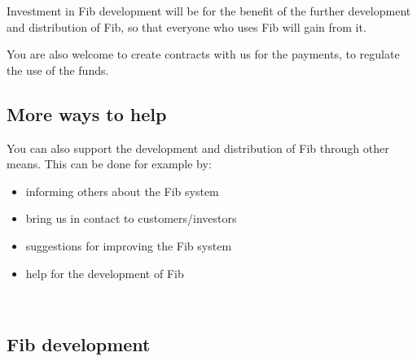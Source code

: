\documentclass[12pt,a4paper]{article}
\begin{document}
Investment in Fib development will be for the benefit of the further development and distribution of Fib, so that everyone who uses Fib will gain from it.

You are also welcome to create contracts with us for the payments, to regulate the use of the funds.


% 


\subsection{More ways to help}

You can also support the development and distribution of Fib through other means.
This can be done for example by:
\begin{itemize}
 \item informing others about the Fib system
 \item bring us in contact to customers/investors
 \item suggestions for improving the Fib system
 \item help for the development of Fib
\end{itemize}
\ \vspace{-0.60cm}

\subsection{Fib development}
\end{document}

